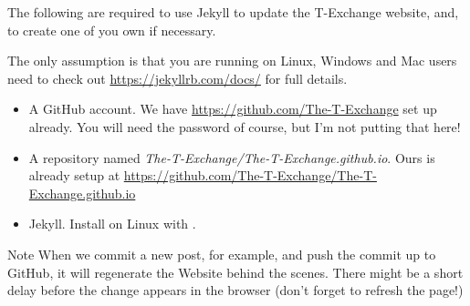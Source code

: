 The following are required to use Jekyll to update the T-Exchange website, and, to create one of you own if necessary.

The only assumption is that you are running on Linux, Windows and Mac users need to check out \url{https://jekyllrb.com/docs/} for full details.

\begin{itemize}
    \item A GitHub account. We have \url{https://github.com/The-T-Exchange} set up already. You will need the password of course, but I'm not putting that here!
    \item A repository named \emph{The-T-Exchange/The-T-Exchange.github.io}. Ours is already setup at \url{https://github.com/The-T-Exchange/The-T-Exchange.github.io}
    \item Jekyll. Install on Linux with .
\end{itemize}

\begin{tips}{Note}
    When we commit a new post, for example, and push the commit up to GitHub, it will regenerate the Website behind the scenes. There might be a short delay before the change appears in the browser (don't forget to refresh the page!)
\end{tips}